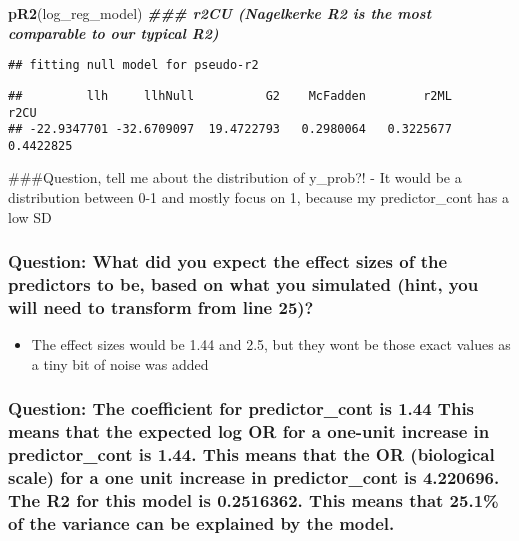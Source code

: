 \documentclass[
]{article}
\newenvironment{Shaded}{\begin{snugshade}}{\end{snugshade}}
\newcommand{\DocumentationTok}[1]{\textcolor[rgb]{0.56,0.35,0.01}{\textbf{\textit{#1}}}}
\newcommand{\FunctionTok}[1]{\textcolor[rgb]{0.13,0.29,0.53}{\textbf{#1}}}
\newcommand{\NormalTok}[1]{#1}
\providecommand{\tightlist}{%
  \setlength{\itemsep}{0pt}\setlength{\parskip}{0pt}}
\begin{document}
\begin{Shaded}
\begin{Highlighting}[]
\FunctionTok{pR2}\NormalTok{(log\_reg\_model) }\DocumentationTok{\#\#\# r2CU (Nagelkerke R2 is the most comparable to our typical R2)}
\end{Highlighting}
\end{Shaded}

\begin{verbatim}
## fitting null model for pseudo-r2
\end{verbatim}

\begin{verbatim}
##         llh     llhNull          G2    McFadden        r2ML        r2CU 
## -22.9347701 -32.6709097  19.4722793   0.2980064   0.3225677   0.4422825
\end{verbatim}

\#\#\#Question, tell me about the distribution of y\_prob?! - It would
be a distribution between 0-1 and mostly focus on 1, because my
predictor\_cont has a low SD

\subsubsection{Question: What did you expect the effect sizes of the
predictors to be, based on what you simulated (hint, you will need to
transform from line
25)?}\label{question-what-did-you-expect-the-effect-sizes-of-the-predictors-to-be-based-on-what-you-simulated-hint-you-will-need-to-transform-from-line-25}

\begin{itemize}
\tightlist
\item
  The effect sizes would be 1.44 and 2.5, but they wont be those exact
  values as a tiny bit of noise was added
\end{itemize}

\subsubsection{Question: The coefficient for predictor\_cont is 1.44
This means that the expected log OR for a one-unit increase in
predictor\_cont is 1.44. This means that the OR (biological scale) for a
one unit increase in predictor\_cont is 4.220696. The R2 for this model
is 0.2516362. This means that 25.1\% of the variance can be explained by
the
model.}\label{question-the-coefficient-for-predictor_cont-is-1.44-this-means-that-the-expected-log-or-for-a-one-unit-increase-in-predictor_cont-is-1.44.-this-means-that-the-or-biological-scale-for-a-one-unit-increase-in-predictor_cont-is-4.220696.-the-r2-for-this-model-is-0.2516362.-this-means-that-25.1-of-the-variance-can-be-explained-by-the-model.}
\end{document}
